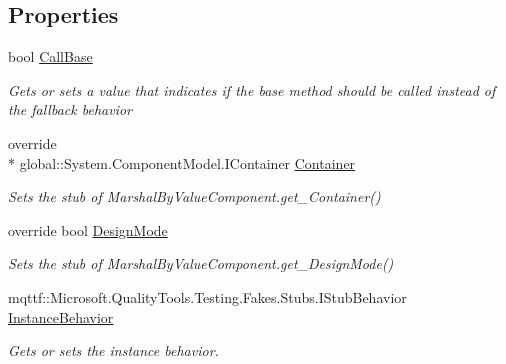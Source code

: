 \subsection*{Properties}
\begin{DoxyCompactItemize}
\item 
bool \hyperlink{class_system_1_1_component_model_1_1_fakes_1_1_stub_marshal_by_value_component_ac83e2fc01ea319426d8cde021179d159}{Call\-Base}
\begin{DoxyCompactList}\small\item\em Gets or sets a value that indicates if the base method should be called instead of the fallback behavior\end{DoxyCompactList}\item 
override \\*
global\-::\-System.\-Component\-Model.\-I\-Container \hyperlink{class_system_1_1_component_model_1_1_fakes_1_1_stub_marshal_by_value_component_afa57590494a52c366ddbd8e0c34785e2}{Container}
\begin{DoxyCompactList}\small\item\em Sets the stub of Marshal\-By\-Value\-Component.\-get\-\_\-\-Container()\end{DoxyCompactList}\item 
override bool \hyperlink{class_system_1_1_component_model_1_1_fakes_1_1_stub_marshal_by_value_component_a9620e20f59caf6627655a348611a84b5}{Design\-Mode}
\begin{DoxyCompactList}\small\item\em Sets the stub of Marshal\-By\-Value\-Component.\-get\-\_\-\-Design\-Mode()\end{DoxyCompactList}\item 
mqttf\-::\-Microsoft.\-Quality\-Tools.\-Testing.\-Fakes.\-Stubs.\-I\-Stub\-Behavior \hyperlink{class_system_1_1_component_model_1_1_fakes_1_1_stub_marshal_by_value_component_adcba1fa47a624240661bac16dbcb83d2}{Instance\-Behavior}
\begin{DoxyCompactList}\small\item\em Gets or sets the instance behavior.\end{DoxyCompactList}\item 

\end{DoxyCompactItemize}
